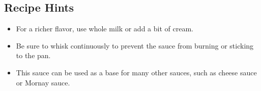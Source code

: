 \subsection*{Recipe Hints}
\begin{itemize}
    \item For a richer flavor, use whole milk or add a bit of cream.
    \item Be sure to whisk continuously to prevent the sauce from burning or sticking to the pan.
    \item This sauce can be used as a base for many other sauces, such as cheese sauce or Mornay sauce.
\end{itemize}
